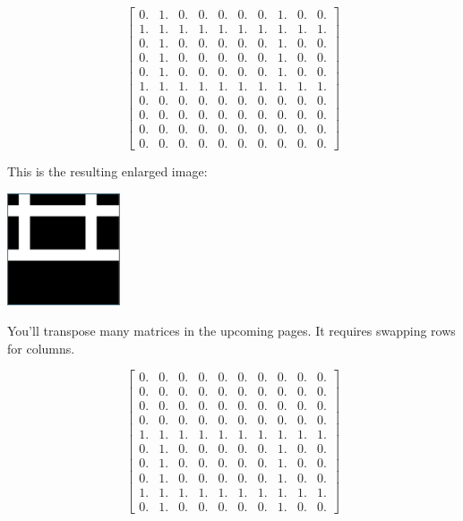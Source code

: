 $$\begin{bmatrix}
0. & 1. & 0. & 0. & 0. & 0. & 0. & 1. & 0. & 0.\\
1. & 1. & 1. & 1. & 1. & 1. & 1. & 1. & 1. & 1.\\
0. & 1. & 0. & 0. & 0. & 0. & 0. & 1. & 0. & 0.\\
0. & 1. & 0. & 0. & 0. & 0. & 0. & 1. & 0. & 0.\\
0. & 1. & 0. & 0. & 0. & 0. & 0. & 1. & 0. & 0.\\
1. & 1. & 1. & 1. & 1. & 1. & 1. & 1. & 1. & 1.\\
0. & 0. & 0. & 0. & 0. & 0. & 0. & 0. & 0. & 0.\\
0. & 0. & 0. & 0. & 0. & 0. & 0. & 0. & 0. & 0.\\
0. & 0. & 0. & 0. & 0. & 0. & 0. & 0. & 0. & 0.\\
0. & 0. & 0. & 0. & 0. & 0. & 0. & 0. & 0. & 0.
\end{bmatrix}$$

This is the resulting enlarged image:

\includegraphics[width=0.25\textwidth]{rotate90.png}

You'll transpose many matrices in the upcoming pages. It requires swapping rows for columns. 

$$\begin{bmatrix}
0. & 0. & 0. & 0. & 0. & 0. & 0. & 0. & 0. & 0.\\
0. & 0. & 0. & 0. & 0. & 0. & 0. & 0. & 0. & 0.\\
0. & 0. & 0. & 0. & 0. & 0. & 0. & 0. & 0. & 0.\\
0. & 0. & 0. & 0. & 0. & 0. & 0. & 0. & 0. & 0.\\
1. & 1. & 1. & 1. & 1. & 1. & 1. & 1. & 1. & 1.\\
0. & 1. & 0. & 0. & 0. & 0. & 0. & 1. & 0. & 0.\\
0. & 1. & 0. & 0. & 0. & 0. & 0. & 1. & 0. & 0.\\
0. & 1. & 0. & 0. & 0. & 0. & 0. & 1. & 0. & 0.\\
1. & 1. & 1. & 1. & 1. & 1. & 1. & 1. & 1. & 1.\\
0. & 1. & 0. & 0. & 0. & 0. & 0. & 1. & 0. & 0.
\end{bmatrix}$$

